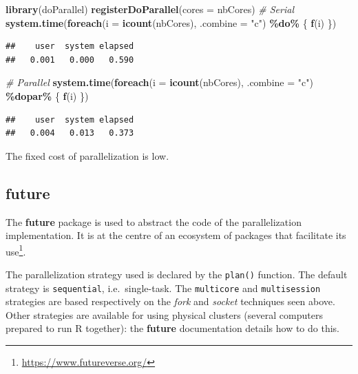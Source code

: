 \documentclass[
  12pt,
  american,
  a4paper,
  extrafontsizes,onecolumn,openright
  ]{memoir}
\newenvironment{Shaded}{\begin{snugshade}}{\end{snugshade}}
\newcommand{\AttributeTok}[1]{\textcolor[rgb]{0.13,0.29,0.53}{#1}}
\newcommand{\CommentTok}[1]{\textcolor[rgb]{0.56,0.35,0.01}{\textit{#1}}}
\newcommand{\FunctionTok}[1]{\textcolor[rgb]{0.13,0.29,0.53}{\textbf{#1}}}
\newcommand{\NormalTok}[1]{#1}
\newcommand{\SpecialCharTok}[1]{\textcolor[rgb]{0.81,0.36,0.00}{\textbf{#1}}}
\newcommand{\StringTok}[1]{\textcolor[rgb]{0.31,0.60,0.02}{#1}}
\begin{document}
\scriptsize

\begin{Shaded}
\begin{Highlighting}[]
\FunctionTok{library}\NormalTok{(doParallel)}
\FunctionTok{registerDoParallel}\NormalTok{(}\AttributeTok{cores =}\NormalTok{ nbCores)}
\CommentTok{\# Serial}
\FunctionTok{system.time}\NormalTok{(}\FunctionTok{foreach}\NormalTok{(}\AttributeTok{i =} \FunctionTok{icount}\NormalTok{(nbCores), }\AttributeTok{.combine =} \StringTok{"c"}\NormalTok{) }\SpecialCharTok{\%do\%}
\NormalTok{    \{}
        \FunctionTok{f}\NormalTok{(i)}
\NormalTok{    \})}
\end{Highlighting}
\end{Shaded}

\begin{verbatim}
##    user  system elapsed 
##   0.001   0.000   0.590
\end{verbatim}

\begin{Shaded}
\begin{Highlighting}[]
\CommentTok{\# Parallel}
\FunctionTok{system.time}\NormalTok{(}\FunctionTok{foreach}\NormalTok{(}\AttributeTok{i =} \FunctionTok{icount}\NormalTok{(nbCores), }\AttributeTok{.combine =} \StringTok{"c"}\NormalTok{) }\SpecialCharTok{\%dopar\%}
\NormalTok{    \{}
        \FunctionTok{f}\NormalTok{(i)}
\NormalTok{    \})}
\end{Highlighting}
\end{Shaded}

\begin{verbatim}
##    user  system elapsed 
##   0.004   0.013   0.373
\end{verbatim}

\normalsize

The fixed cost of parallelization is low.

\subsection{future}\label{future}

The \textbf{future} package is used to abstract the code of the parallelization implementation.
It is at the centre of an ecosystem of packages that facilitate its use\footnote{\url{https://www.futureverse.org/}}.

The parallelization strategy used is declared by the \texttt{plan()} function.
The default strategy is \texttt{sequential}, i.e.~single-task.
The \texttt{multicore} and \texttt{multisession} strategies are based respectively on the \emph{fork} and \emph{socket} techniques seen above.
Other strategies are available for using physical clusters (several computers prepared to run R together): the \textbf{future} documentation details how to do this.
\end{document}

